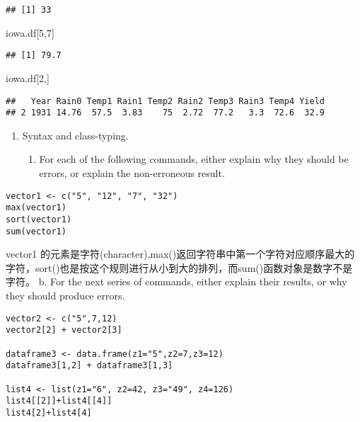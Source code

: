 \documentclass[
]{article}
\newenvironment{Shaded}{\begin{snugshade}}{\end{snugshade}}
\newcommand{\DecValTok}[1]{\textcolor[rgb]{0.00,0.00,0.81}{#1}}
\newcommand{\NormalTok}[1]{#1}
\providecommand{\tightlist}{%
  \setlength{\itemsep}{0pt}\setlength{\parskip}{0pt}}
\begin{document}
\begin{verbatim}
## [1] 33
\end{verbatim}

\begin{Shaded}
\begin{Highlighting}[]
\NormalTok{iowa.df[}\DecValTok{5}\NormalTok{,}\DecValTok{7}\NormalTok{]}
\end{Highlighting}
\end{Shaded}

\begin{verbatim}
## [1] 79.7
\end{verbatim}

\begin{Shaded}
\begin{Highlighting}[]
\NormalTok{iowa.df[}\DecValTok{2}\NormalTok{,]}
\end{Highlighting}
\end{Shaded}

\begin{verbatim}
##   Year Rain0 Temp1 Rain1 Temp2 Rain2 Temp3 Rain3 Temp4 Yield
## 2 1931 14.76  57.5  3.83    75  2.72  77.2   3.3  72.6  32.9
\end{verbatim}

\begin{enumerate}
\def\labelenumi{\arabic{enumi}.}
\setcounter{enumi}{1}
\tightlist
\item
  Syntax and class-typing.

  \begin{enumerate}
  \def\labelenumii{\alph{enumii}.}
  \tightlist
  \item
    For each of the following commands, either explain why they should
    be errors, or explain the non-erroneous result.
  \end{enumerate}
\end{enumerate}

\begin{verbatim}
vector1 <- c("5", "12", "7", "32")
max(vector1)
sort(vector1)
sum(vector1)
\end{verbatim}

vector1
的元素是字符(character),max()返回字符串中第一个字符对应顺序最大的字符，sort()也是按这个规则进行从小到大的排列，而sum()函数对象是数字不是字符。
b. For the next series of commands, either explain their results, or why
they should produce errors.

\begin{verbatim}
vector2 <- c("5",7,12)
vector2[2] + vector2[3]

dataframe3 <- data.frame(z1="5",z2=7,z3=12)
dataframe3[1,2] + dataframe3[1,3]

list4 <- list(z1="6", z2=42, z3="49", z4=126)
list4[[2]]+list4[[4]]
list4[2]+list4[4]
\end{verbatim}
\end{document}
